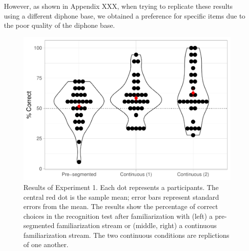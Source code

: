 \documentclass[]{article}
\begin{document}
However, as shown in Appendix XXX, when trying to replicate these
results using a different diphone base, we obtained a preference for
specific items due to the poor quality of the diphone base.

\begin{figure}

{\centering \includegraphics[width=0.8\linewidth]{segmentation_recall_combined_files/figure-latex/stats-london-stats.3x.us.segm.cont.plot-1} 

}

\caption{Results of Experiment 1. Each dot represents a participants. The central red dot is the sample mean; error bars represent standard errors from the mean. The results show the percentage of correct choices in the recognition test after familiarization with (left) a pre-segmented familiarization stream or (middle, right) a continuous familiarization stream. The two continuous conditions are replictions of one another.}\label{fig:stats-london-stats.3x.us.segm.cont.plot}
\end{figure}
\end{document}
